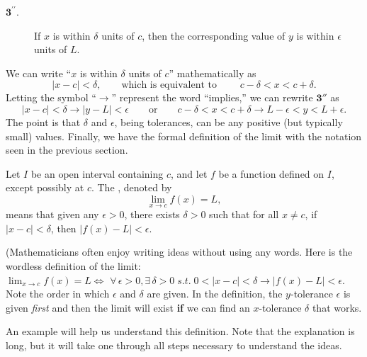 \begin{description}
\item[$\textbf{3}^{\prime \prime}$.]If $x$ is within $\delta$ units of $c$, then the corresponding value of $y$ is within $\epsilon$ units of $L$.
\end{description}

We can write ``$x$ is within $\delta$ units of $c$'' mathematically as
$$|x-c| < \delta, \qquad \text{which is equivalent to }\qquad c-\delta < x < c+\delta.$$
Letting the symbol ``$\longrightarrow$'' represent the word ``implies,'' we can rewrite $\textbf{3}''$ as 
$$
|x - c| < \delta \longrightarrow  |y - L| < \epsilon 
\qquad \textrm{or} \qquad c - \delta < x < c + \delta \longrightarrow L - \epsilon < y < L + \epsilon.
$$
The point is that $\delta$ and $\epsilon$, being tolerances, can be any positive (but typically small) values.  Finally, we have the formal definition of the limit with the notation  seen in the previous section.

{Let $I$ be an open interval containing $c$, and let $f$ be a function defined on $I$, except possibly at $c$. The , denoted by  
$$\displaystyle \lim_{x\rightarrow c} f(x) = L,$$
means that given any $\epsilon > 0$, there exists $\delta > 0$ such that for all $x\neq c$,  
if  $|x - c| < \delta$, then $|f(x) - L| < \epsilon$.
}

(Mathematicians often enjoy writing ideas without using any words. Here is the wordless definition of the limit:\\

$\displaystyle \lim_{x\rightarrow c} f(x) = L \iff$
$\forall \, \epsilon > 0, \exists \, \delta > 0 \; s.t. \;
0<|x - c| < \delta \longrightarrow |f(x) - L| < \epsilon$.\text{)}\\

Note the order in which $\epsilon$ and $\delta$ are given.  In the definition, the $y$-tolerance $\epsilon$ is given \textit{first} and then the limit will exist {\bf if} we can find an $x$-tolerance $\delta$ that works.  

An example will help us understand this definition.  Note that the explanation is long, but it will take one through all steps necessary to understand the ideas.\\

